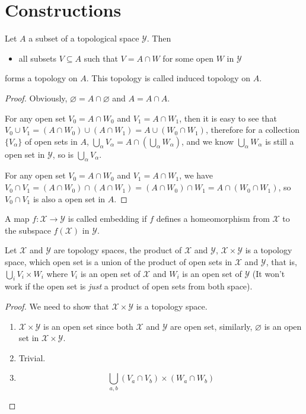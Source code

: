 \documentclass[./main.tex]{subfiles}
\begin{document}
\section{Constructions}

\begin{definition}[Induced]
  Let $A$ a subset of a topological space $\mathcal{Y}$. Then
  \begin{itemize}
    \item all subsets $V \subseteq A$ such that $V = A \cap W$ for some open $W$ in $\mathcal{Y}$
  \end{itemize}
  forms a topology on $A$. This topology is called induced topology on $A$.
\end{definition}
\begin{proof}
  Obviously, $\varnothing = A \cap \varnothing$ and $A = A \cap A$.

  For any open set $V_0 = A \cap W_0$ and $V_1 = A \cap W_1$,
  then it is easy to see that $V_0 \cup V_1 = (A \cap W_0) \cup (A \cap W_1) = A \cup (W_0 \cap W_1)$,
  therefore for a collection $\{V_\alpha\}$ of open sets in $A$, $\bigcup_\alpha V_\alpha = A \cap (\bigcup_\alpha W_\alpha)$,
  and we know $\bigcup_\alpha W_\alpha$ is still a open set in $\mathcal{Y}$, so is $\bigcup_\alpha V_\alpha$.

  For any open set $V_0 = A \cap W_0$ and $V_1 = A \cap W_1$,
  we have $V_0 \cap V_1 = (A \cap W_0) \cap (A \cap W_1) = (A \cap W_0) \cap W_1 = A \cap (W_0 \cap W_1)$,
  so $V_0 \cap V_1$ is also a open set in $A$.
\end{proof}

\begin{definition}[Embedding]
  A map $f : \mathcal{X} \rightarrow \mathcal{Y}$ is called embedding if $f$ defines
  a homeomorphism from $\mathcal{X}$ to the subspace $f(\mathcal{X})$ in $\mathcal{Y}$.
\end{definition}

\begin{definition}[Product]
  Let $\mathcal{X}$ and $\mathcal{Y}$ are topology spaces, the product of
  $\mathcal{X}$ and $\mathcal{Y}$, $\mathcal{X} \times \mathcal{Y}$ is a topology
  space, which open set is a union of the product of open sets in $\mathcal{X}$ and $\mathcal{Y}$,
  that is, $\bigcup_i V_i \times W_i$ where $V_i$ is an open set of $\mathcal{X}$ 
  and $W_i$ is an open set of $\mathcal{Y}$ 
  (It won't work if the open set is \textit{just} a product of open sets from both space).
\end{definition}
\begin{proof}
  We need to show that $\mathcal{X} \times \mathcal{Y}$ is a topology space.
  \begin{enumerate}
    \item $\mathcal{X} \times \mathcal{Y}$ is an open set since both $\mathcal{X}$ and $\mathcal{Y}$ are open set,
          similarly, $\varnothing$ is an open set in $\mathcal{X} \times \mathcal{Y}$.
    \item Trivial.
    \item \[
          \bigcup_{a, b} (V_a \cap V_b) \times (W_a \cap W_b)
          \]
  \end{enumerate}
\end{proof}
\end{document}
